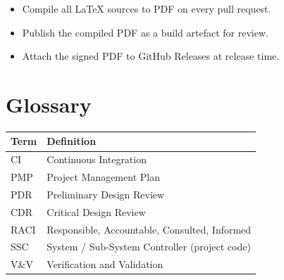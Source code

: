 \documentclass[12pt,a4paper]{article}
\begin{document}
\begin{itemize}
  \item Compile all \LaTeX{} sources to PDF on every pull request.
  \item Publish the compiled PDF as a build artefact for review.
  \item Attach the signed PDF to GitHub Releases at release time.
\end{itemize}

\section{Glossary}
\begin{tabularx}{\textwidth}{|l|X|}
  \hline
  \rowcolor{lightgray}
  \textbf{Term} & \textbf{Definition} \\
  \hline
  CI   & Continuous Integration \\
  PMP  & Project Management Plan \\
  PDR  & Preliminary Design Review \\
  CDR  & Critical Design Review \\
  RACI & Responsible, Accountable, Consulted, Informed \\
  SSC  & System / Sub-System Controller (project code) \\
  V\&V & Verification and Validation \\
  \hline
\end{tabularx}
\end{document}
